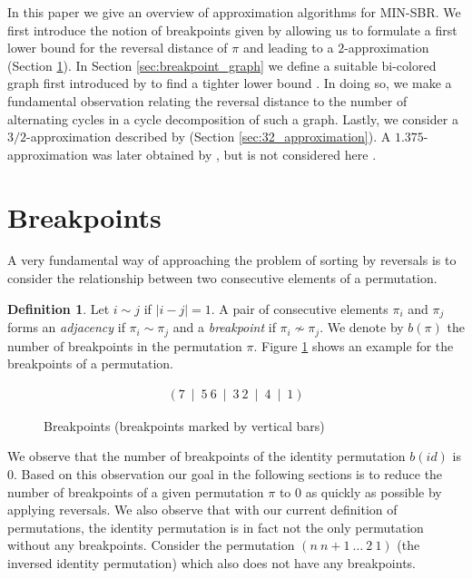 \documentclass[11pt,DIV=11]{scrartcl}
\theoremstyle{definition}
\newtheorem{definition}[theorem]{Definition}
\theoremstyle{remark}
\begin{document}
In this paper we give an overview of approximation algorithms for MIN-SBR. We first introduce the notion of breakpoints given by \citeauthor*{Kececioglu1995} allowing us to formulate a first lower bound for the reversal distance of $\pi$ and leading to a $2$-approximation \cite{Kececioglu1995} (Section \ref{sec:breakpoints}). In Section \ref{sec:breakpoint_graph} we define a suitable bi-colored graph first introduced by \citeauthor*{Bafna1996} to find a tighter lower bound \cite{Bafna1996}. In doing so, we make a fundamental observation relating the reversal distance to the number of alternating cycles in a cycle decomposition of such a graph. Lastly, we consider a $3/2$-approximation described by \citeauthor{Christie1998} \cite{Christie1998} (Section \ref{sec:32_approximation}). A $1.375$-approximation was later obtained by \citeauthor*{Berman2001}, but is not considered here \cite{Berman2001}.

\section{Breakpoints}
\label{sec:breakpoints}

A very fundamental way of approaching the problem of sorting by reversals is to consider the relationship between two consecutive elements of a permutation.

\begin{definition}
Let $i \sim j$ if $|i - j| = 1$. A pair of consecutive elements $\pi_i$ and $\pi_j$ forms an \textit{adjacency} if $\pi_i \sim \pi_j$ and a \textit{breakpoint} if $\pi_i \not\sim \pi_j$. We denote by $b(\pi)$ the number of breakpoints in the permutation $\pi$. Figure \ref{fig:breakpoints} shows an example for the breakpoints of a permutation.
\end{definition}

\begin{figure}
    \begin{align*}
        (7\ \mid\ 5\ 6\ \mid\ 3\ 2\ \mid\ 4\ \mid\ 1)
    \end{align*}
    \caption{Breakpoints (breakpoints marked by vertical bars)}
    \label{fig:breakpoints}
\end{figure}

We observe that the number of breakpoints of the identity permutation $b(id)$ is $0$. Based on this observation our goal in the following sections is to reduce the number of breakpoints of a given permutation $\pi$ to $0$ as quickly as possible by applying reversals. We also observe that with our current definition of permutations, the identity permutation is in fact not the only permutation without any breakpoints. Consider the permutation $(n\ n+1\ \dots\ 2\ 1)$ (the inversed identity permutation) which also does not have any breakpoints.
\end{document}
